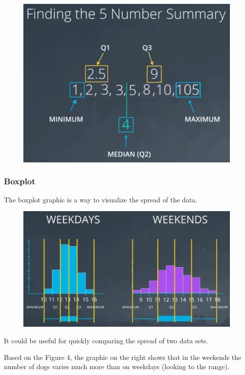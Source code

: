 \documentclass[]{book}
\begin{document}
\begin{figure}
\centering
\includegraphics{01-img/c4_l2_03.png}
\caption{}
\end{figure}

\subsubsection{Boxplot}\label{boxplot}

The boxplot graphic is a way to visualize the spread of the data.

\begin{figure}
\centering
\includegraphics{01-img/c4_l2_04.png}
\caption{}
\end{figure}

It could be useful for quickly comparing the spread of two data sets.

Based on the Figure 4, the graphic on the right shows that in the
weekends the number of dogs varies much more than on weekdays (looking
to the range).
\end{document}
